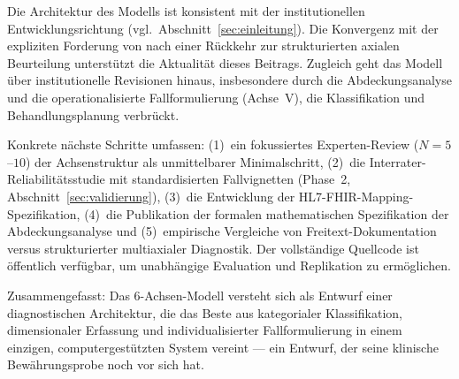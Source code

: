 \documentclass[11pt,a4paper]{article}
\begin{document}
Die Architektur des Modells ist konsistent mit der institutionellen Entwicklungsrichtung (vgl.\ Abschnitt~\ref{sec:einleitung}). Die Konvergenz mit der expliziten Forderung von \citet{ErlichFirst2025} nach einer R\"uckkehr zur strukturierten axialen Beurteilung unterst\"utzt die Aktualit\"at dieses Beitrags. Zugleich geht das Modell \"uber institutionelle Revisionen hinaus, insbesondere durch die Abdeckungsanalyse und die operationalisierte Fallformulierung (Achse~V), die Klassifikation und Behandlungsplanung verbr\"uckt.

Konkrete n\"achste Schritte umfassen: (1)~ein fokussiertes Experten-Review ($N = 5$--$10$) der Achsenstruktur als unmittelbarer Minimalschritt, (2)~die Interrater-Reliabilit\"atsstudie mit standardisierten Fallvignetten (Phase~2, Abschnitt~\ref{sec:validierung}), (3)~die Entwicklung der HL7-FHIR-Mapping-Spezifikation, (4)~die Publikation der formalen mathematischen Spezifikation der Abdeckungsanalyse und (5)~empirische Vergleiche von Freitext-Dokumentation versus strukturierter multiaxialer Diagnostik. Der vollst\"andige Quellcode ist \"offentlich verf\"ugbar, um unabh\"angige Evaluation und Replikation zu erm\"oglichen.

Zusammengefasst: Das 6-Achsen-Modell versteht sich als Entwurf einer diagnostischen Architektur, die das Beste aus kategorialer Klassifikation, dimensionaler Erfassung und individualisierter Fallformulierung in einem einzigen, computergest\"utzten System vereint --- ein Entwurf, der seine klinische Bew\"ahrungsprobe noch vor sich hat.
\end{document}
